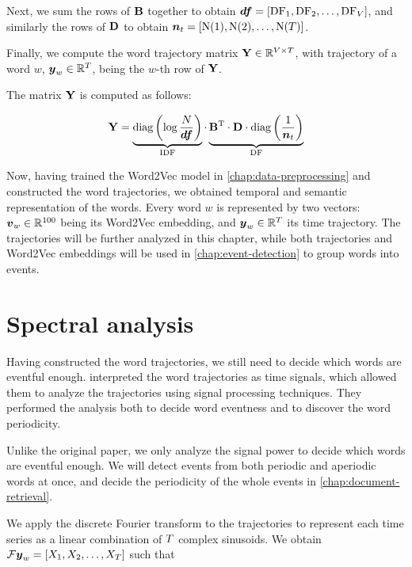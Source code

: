 Next, we sum the rows of $\mathbf{B}$ together to obtain $\vect{\df} = \left[ \text{\df}_{1}, \text{\df}_{2}, \dots, \text{\df}_{\featcount} \right]$, and similarly the rows of $\mathbf{D}$ to obtain $\vect{\doccount}_{t} = \left[ \text{\doccount}(1), \text{\doccount}(2), \dots, \text{\doccount}(\streamlen) \right]$.

Finally, we compute the word trajectory matrix $\mathbf{Y} \in \mathbb{R}^{V \times T}$, with trajectory of a word $w$, $\vect{\traj}_w \in \R^{\streamlen}$, being the $w$-th row of $\mathbf{Y}$.

The matrix $\mathbf{Y}$ is computed as follows:

\begin{equation}
	\trajmat =
		\underbrace{\text{diag} \left( \log{\frac{\doccount}{\vect{\df}}} \right)}_{\text{IDF}}
		\cdot
		\underbrace{\bowmat^{\T}
		\cdot \dtdmat
		\cdot \text{diag} \left( \frac{1}{\vect{\doccount}_{t}} \right)}_{\text{DF}}
\end{equation}

Now, having trained the Word2Vec model in \autoref{chap:data-preprocessing} and constructed the word trajectories, we obtained temporal and semantic representation of the words. Every word $w$ is represented by two vectors: $\embed_{w} \in \R^{100}$ being its Word2Vec embedding, and $\vect{\traj}_{w} \in \R^{\streamlen}$ its time trajectory. The trajectories will be further analyzed in this chapter, while both trajectories and Word2Vec embeddings will be used in \autoref{chap:event-detection} to group words into events.


\section{Spectral analysis} \label{sec:spectral-analysis}
Having constructed the word trajectories, we still need to decide which words are eventful enough. \cite{event-detection} interpreted the word trajectories as time signals, which allowed them to analyze the trajectories using signal processing techniques. They performed the analysis both to decide word eventness and to discover the word periodicity.

Unlike the original paper, we only analyze the signal power to decide which words are eventful enough. We will detect events from both periodic and aperiodic words at once, and decide the periodicity of the whole events in \autoref{chap:document-retrieval}.

We apply the discrete Fourier transform to the trajectories to represent each time series as a linear combination of $T$ complex sinusoids. We obtain $\mathcal{F} \vect{\traj}_{w} = \left[ X_{1}, X_{2}, \dots, X_{\streamlen}\right ]$ such that

